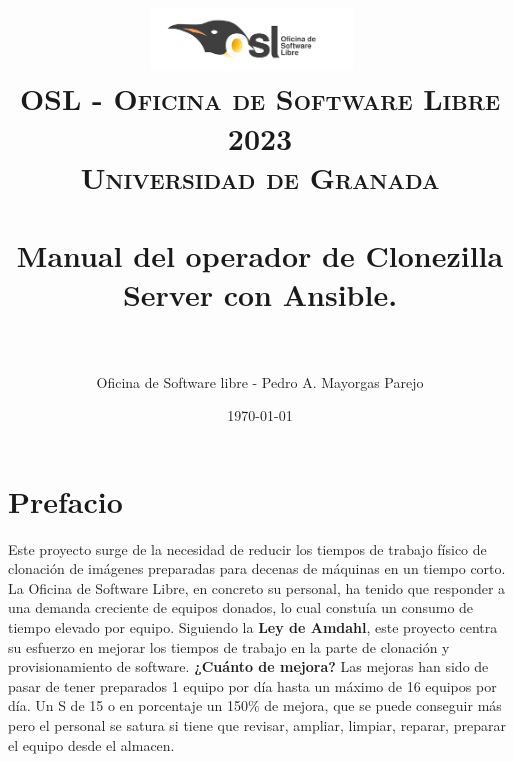 
\graphicspath{ {img/} }

\title{
\normalfont \normalsize
\includegraphics[width=0.4\textwidth]{img/osl.png}~\\[1cm]
\textsc{\textbf{OSL - Oficina de Software Libre \\ 2023 \\ Universidad de Granada} \\ [25pt] }
\horrule{0.5pt} \\[0.4cm] %
\huge Manual del operador de Clonezilla Server con Ansible. \\ 
\horrule{2pt} \\[0.5cm] %
}

\author{Oficina de Software libre - Pedro A. Mayorgas Parejo} %

\date{\normalsize\today} %




\maketitle %

\newpage %

\tableofcontents %

\newpage

\section{Prefacio}

Este proyecto surge de la necesidad de reducir los tiempos de trabajo físico de clonación de imágenes preparadas para decenas de máquinas en un tiempo corto.
La Oficina de Software Libre, en concreto su personal, ha tenido que responder a una demanda creciente de equipos donados, lo cual constuía un consumo de tiempo elevado
por equipo. Siguiendo la \textbf{Ley de Amdahl}, este proyecto centra su esfuerzo en mejorar los tiempos de trabajo en la parte de clonación y provisionamiento de software.
\vspace{5mm}
\textbf{¿Cuánto de mejora?} Las mejoras han sido de pasar de tener preparados 1 equipo por día hasta un máximo de 16 equipos por día. Un S de 15 o en porcentaje un 150\% de mejora, que se puede conseguir más pero
el personal se satura si tiene que revisar, ampliar, limpiar, reparar, preparar el equipo desde el almacen.

